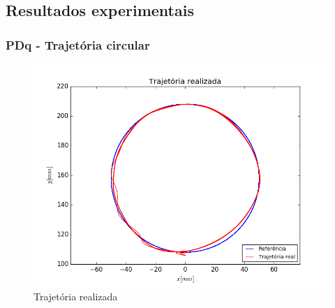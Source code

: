 \documentclass[]{politex}
\begin{document}
\newpage

\subsection{Resultados experimentais}

\subsubsection{PDq - Trajetória circular}

\begin{figure}[H]
	\centering
	\includegraphics[scale=0.39]{../../../Experimental/Aquisicoes/PIDt_circulo/xy.png}  
	\caption{Trajetória realizada}
	\label{fig:PIDq_circulo_xy}
\end{figure}
\end{document}
